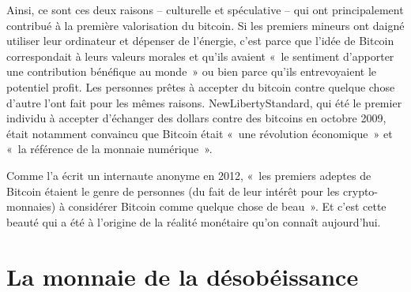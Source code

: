 Ainsi, ce sont ces deux raisons -- culturelle et spéculative -- qui ont principalement contribué à la première valorisation du bitcoin. Si les premiers mineurs ont daigné utiliser leur ordinateur et dépenser de l'énergie, c'est parce que l'idée de Bitcoin correspondait à leurs valeurs morales et qu'ils avaient «~le sentiment d'apporter une contribution bénéfique au monde~» ou bien parce qu'ils entrevoyaient le potentiel profit. Les personnes prêtes à accepter du bitcoin contre quelque chose d'autre l'ont fait pour les mêmes raisons. NewLibertyStandard, qui été le premier individu à accepter d'échanger des dollars contre des bitcoins en octobre 2009, était notamment convaincu que Bitcoin était «~une révolution économique~» et «~la référence de la monnaie numérique~». %

Comme l'a écrit un internaute anonyme en 2012, «~les premiers adeptes de Bitcoin étaient le genre de personnes (du fait de leur intérêt pour les crypto-monnaies) à considérer Bitcoin comme quelque chose de beau~». Et c'est cette beauté qui a été à l'origine de la réalité monétaire qu'on connaît aujourd'hui.

\section*{La monnaie de la désobéissance}

